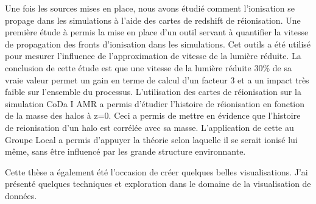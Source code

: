 Une fois les sources mises en place, nous avons étudié comment l'ionisation se propage dans les simulations à l'aide des cartes de redshift de réionisation.
Une première étude à permis la mise en place d'un outil servant à quantifier la vitesse de propagation des fronts d'ionisation dans les simulations.
Cet outils a été utilisé pour mesurer l'influence de l'approximation de vitesse de la lumière réduite.
La conclusion de cette étude est que une vitesse de la lumière réduite 30\% de sa vraie valeur permet un gain en terme de calcul d'un facteur 3 et a un impact très faible sur l'ensemble du processus.
L'utilisation des cartes de réionisation sur la simulation CoDa I AMR a permis d'étudier l'histoire de réionisation en fonction de la masse des halos à z=0.
Ceci a permis de mettre en évidence que l'histoire de reionisation d'un halo est corrélée avec sa masse.%
L'application de cette au Groupe Local a permis d'appuyer la théorie selon  laquelle il se serait ionisé lui même, sans être influencé par les grande structure environnante.



Cette thèse a également été l'occasion de créer quelques belles visualisations. %
J'ai présenté quelques techniques et exploration dans le domaine de la visualisation de données.




